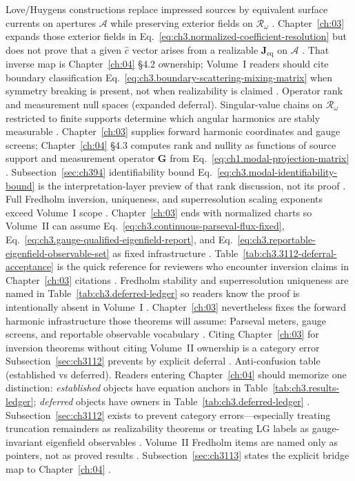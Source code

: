 Love/Huygens constructions replace impressed sources by equivalent surface currents on apertures \(\mathcal{A}\) while preserving exterior fields on \(\mathcal{R}_\omega\)
\cite{stratton1941}. Chapter~\ref{ch:03} expands those exterior fields in Eq.~\eqref{eq:ch3.normalized-coefficient-resolution} but does not prove that a given \(\widehat{c}\) vector arises from a realizable \(\mathbf{J}_{\mathrm{eq}}\) on \(\mathcal{A}\)
\cite{devaney2004}. That inverse map is Chapter~\ref{ch:04} §4.2 ownership; Volume~I readers should cite boundary classification Eq.~\eqref{eq:ch3.boundary-scattering-mixing-matrix} when symmetry breaking is present, not when realizability is claimed
\cite{jackson1999}.
Operator rank and measurement null spaces (expanded deferral). Singular-value chains on \(\mathcal{R}_\omega\) restricted to finite supports determine which angular harmonics are stably measurable
\cite{devaney2004}. Chapter~\ref{ch:03} supplies forward harmonic coordinates and gauge screens; Chapter~\ref{ch:04} §4.3 computes rank and nullity as functions of source support and measurement operator \(\mathbf{G}\) from Eq.~\eqref{eq:ch1.modal-projection-matrix}
\cite{harrington2001}. Subsection~\ref{sec:ch394} identifiability bound Eq.~\eqref{eq:ch3.modal-identifiability-bound} is the interpretation-layer preview of that rank discussion, not its proof
\cite{devaney2004}.
Full Fredholm inversion, uniqueness, and superresolution scaling exponents exceed Volume~I scope \cite{devaney2004}. Chapter~\ref{ch:03} ends with normalized charts so Volume~II can assume Eq.~\eqref{eq:ch3.continuous-parseval-flux-fixed}, Eq.~\eqref{eq:ch3.gauge-qualified-eigenfield-report}, and Eq.~\eqref{eq:ch3.reportable-eigenfield-observable-set} as fixed infrastructure
\cite{hansen1988}. Table~\ref{tab:ch3.3112-deferral-acceptance} is the quick reference for reviewers who encounter inversion claims in Chapter~\ref{ch:03} citations
\cite{harrington2001}.
Fredholm stability and superresolution uniqueness are named in Table~\ref{tab:ch3.deferred-ledger} so readers know the proof is intentionally absent in Volume~I
\cite{devaney2004}. Chapter~\ref{ch:03} nevertheless fixes the forward harmonic infrastructure those theorems will assume: Parseval meters, gauge screens, and reportable observable vocabulary
\cite{hansen1988}. Citing Chapter~\ref{ch:03} for inversion theorems without citing Volume~II ownership is a category error Subsection~\ref{sec:ch3112} prevents by explicit deferral
\cite{harrington2001}.
Anti-confusion table (established vs deferred). Readers entering Chapter~\ref{ch:04} should memorize one distinction: \emph{established} objects have equation anchors in Table~\ref{tab:ch3.results-ledger}; \emph{deferred} objects have owners in Table~\ref{tab:ch3.deferred-ledger}
\cite{stratton1941}. Subsection~\ref{sec:ch3112} exists to prevent category errors---especially treating truncation remainders as realizability theorems or treating LG labels as gauge-invariant eigenfield observables
\cite{allen1992}. Volume~II Fredholm items are named only as pointers, not as proved results
\cite{devaney2004}.
Subsection~\ref{sec:ch3113} states the explicit bridge map to Chapter~\ref{ch:04}
\cite{stratton1941}.
